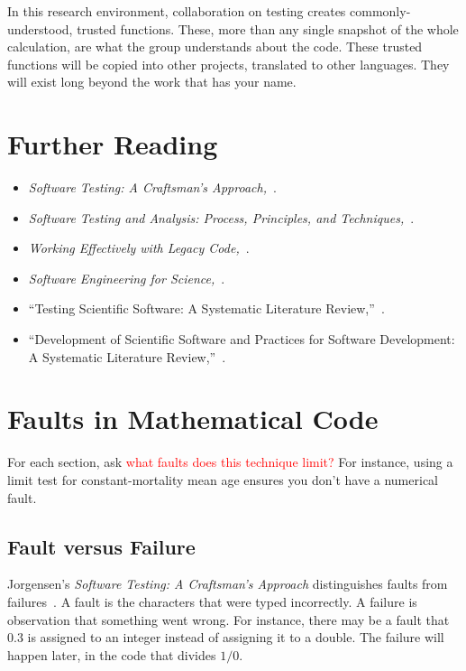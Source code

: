 \documentclass[fleqn,10pt]{olplainarticle}
\newcommand{\aside}[1]{\textcolor{red}{#1}}
\begin{document}
In this research environment, collaboration on testing
creates commonly-understood, trusted functions. These, more
than any single snapshot of the whole calculation, are
what the group understands about the code. These trusted
functions will be copied into other projects, translated
to other languages. They will exist long beyond the work
that has your name.

\section{Further Reading}\label{sec:further-reading}
\begin{itemize}
	\item \emph{Software Testing: A Craftsman's Approach,}~\cite{jorgensen2013}.
	\item \emph{Software Testing and Analysis: Process, Principles, and Techniques,}~\cite{pezze2008}.
	\item \emph{Working Effectively with Legacy Code,}~\cite{feathers2004working}.
	\item \emph{Software Engineering for Science,}~\cite{carver2017}.
	\item ``Testing Scientific Software: A Systematic Literature Review,''~\cite{kanewala2014}.
	\item ``Development of Scientific Software and Practices for Software Development: A Systematic Literature Review,''~\cite{neumann2016}.
	\end{itemize}

\appendix

\section{Faults in Mathematical Code}\label{sec:faults-and-failures}

For each section, ask \aside{what faults does this technique limit?}
For instance, using a limit test for constant-mortality mean age
ensures you don't have a numerical fault.

\subsection{Fault versus Failure}
Jorgensen's \emph{Software Testing: A Craftsman's Approach} distinguishes
faults from failures~\citep{jorgensen2013}.
A fault is the characters that were typed
incorrectly. A failure is observation that something went wrong.
For instance, there may be a fault that 0.3 is assigned to an integer
instead of assigning it to a double. The failure will happen later,
in the code that divides $1 / 0$.
\end{document}
